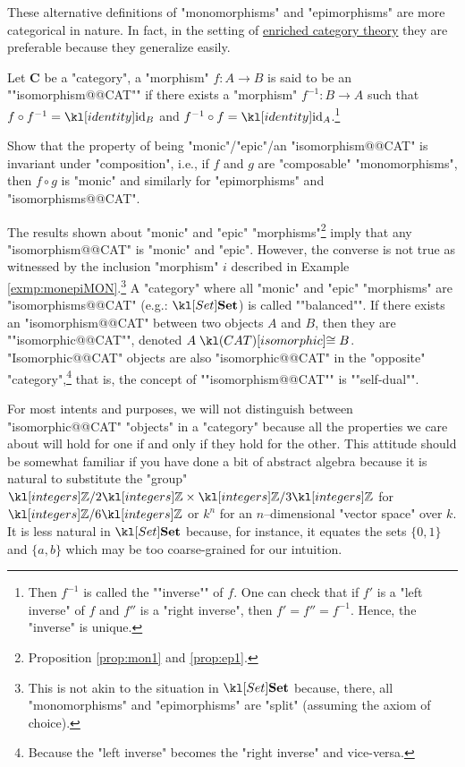 \documentclass[main.tex]{subfiles}
\begin{document}
\begin{rem}
	These alternative definitions of "monomorphisms" and "epimorphisms" are more categorical in nature. In fact, in the setting of \href{https://ncatlab.org/nlab/show/enriched+category+theory}{enriched category theory} they are preferable because they generalize easily.
\end{rem}
\begin{defn}[Isomorphism]\label{defn:isomorphism}
	\AP Let $\mathbf{C}$ be a "category", a "morphism" $f:A\rightarrow B$ is said to be an ""isomorphism@@CAT"" if there exists a "morphism" $f^{-1}: B\rightarrow A$ such that $f\circ f^{-1} = \id_B$ and $f^{-1}\circ f = \id_A$.\footnote{\AP Then $f^{-1}$ is called the ""inverse"" of $f$. One can check that if $f'$ is a "left inverse" of $f$ and $f''$ is a "right inverse", then $f' = f'' = f^{-1}$. Hence, the "inverse" is unique.}
\end{defn}
\begin{exer}\label{exer:duality:composemor}
	Show that the property of being "monic"/"epic"/an "isomorphism@@CAT" is invariant under "composition", i.e., if $f$ and $g$ are "composable" "monomorphisms", then $f \circ g$ is "monic" and similarly for "epimorphisms" and "isomorphisms@@CAT".
\end{exer}
\begin{rem}
	The results shown about "monic" and "epic" "morphisms"\footnote{Proposition \ref{prop:mon1} and \ref{prop:ep1}.} imply that any "isomorphism@@CAT" is "monic" and "epic". However, the converse is not true as witnessed by the inclusion "morphism" $i$ described in Example \ref{exmp:monepiMON}.\footnote{This is not akin to the situation in $\catSet$ because, there, all "monomorphisms" and "epimorphisms" are "split" (assuming the axiom of choice).} \AP A "category" where all "monic" and "epic" "morphisms" are "isomorphisms@@CAT" (e.g.: $\catSet$) is called ""balanced"". \AP If there exists an "isomorphism@@CAT" between two objects $A$ and $B$, then they are ""isomorphic@@CAT"", denoted $A \isoCAT B$. \AP "Isomorphic@@CAT" objects are also "isomorphic@@CAT" in the "opposite" "category",\footnote{Because the "left inverse" becomes the "right inverse" and vice-versa.} that is, the concept of ""isomorphism@@CAT"" is ""self-dual"".
	
	For most intents and purposes, we will not distinguish between "isomorphic@@CAT" "objects" in a "category" because all the properties we care about will hold for one if and only if they hold for the other. This attitude should be somewhat familiar if you have done a bit of abstract algebra because it is natural to substitute the "group" $\Z/2\Z \times \Z/3\Z$ for $\Z/6\Z$ or $k^n$ for an $n$--dimensional "vector space" over $k$. It is less natural in $\catSet$ because, for instance, it equates the sets $\{0,1\}$ and $\{a,b\}$ which may be too coarse-grained for our intuition.
\end{rem} %
\end{document}
